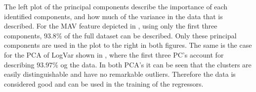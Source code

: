 The left plot of the principal components describe the importance of each identified components, and how much of the variance in the data that is described. For the MAV feature depicted in , using only the first three components, $93.8\%$ of the full dataset can be described. Only these principal components are used in the plot to the right in both figures. The same is the case for the PCA of LogVar shown in , where the first three PC's account for describing $93.97\%$ og the data. In both PCA's it can be seen that the clusters are easily distinguishable and have no remarkable outliers. Therefore the data is considered good and can be used in the training of the regressors.


